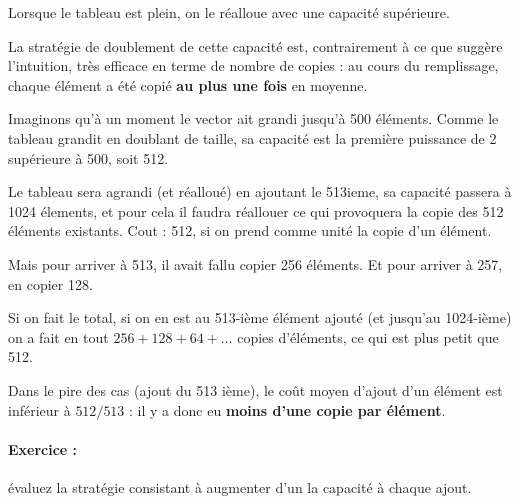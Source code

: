 \label{strategiedoublement}

Lorsque le tableau est plein, on le réalloue
avec une capacité supérieure.

La stratégie de doublement de cette capacité est,
contrairement à ce que suggère l'intuition, très efficace
en terme de nombre de copies : au cours du remplissage,
chaque élément a été copié \textbf{au plus une fois}
en moyenne.

Imaginons qu'à un moment le vector ait grandi jusqu'à 500
éléments. Comme le tableau grandit en doublant de taille, sa capacité
est la première puissance de 2 supérieure à 500, soit 512.

Le tableau sera agrandi (et réalloué) en ajoutant le 513ieme, sa capacité
passera à 1024 élements, et pour cela il faudra réallouer ce qui provoquera
la copie des 
512 éléments existants. Cout : 512, si on prend comme unité la copie d'un élément.

Mais pour arriver à 513, il avait fallu copier 256 éléments. Et pour
arriver à 257, en copier 128.

Si on fait le total, si on en est au 513-ième élément ajouté (et jusqu'au
1024-ième) on a fait en tout $256 + 128 + 64 + \ldots$ copies
d'éléments, ce qui est plus petit que 512.

Dans le pire des cas (ajout du 513 ième), le coût moyen d'ajout d'un
élément est inférieur à $512/513$ : il y a donc eu \textbf{moins d'une
copie par élément}.

\paragraph{Exercice :} évaluez la stratégie consistant à augmenter d'un la capacité à chaque ajout.

